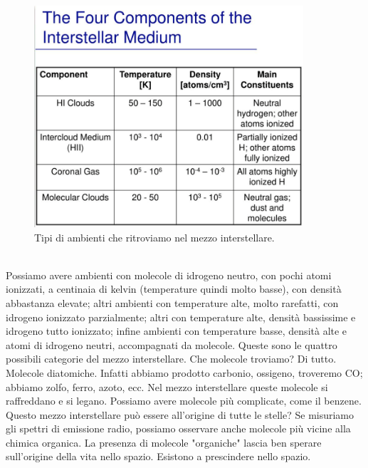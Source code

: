 \documentclass[a4paper,11pt]{article}
\begin{document}
\begin{figure}[h!!]
        \centering
        \includegraphics[width=10cm]{lezione 28 novembre/composizionenubi.png}
        \caption{Tipi di ambienti che ritroviamo nel mezzo interstellare.}
        \label{lezione 28 novembre/composizionenubi.png}
    \end{figure}
    \\
Possiamo avere ambienti con molecole di idrogeno neutro, con pochi atomi ionizzati, a centinaia di kelvin (temperature quindi molto basse), con densità abbastanza elevate; altri ambienti con temperature alte, molto rarefatti, con idrogeno ionizzato parzialmente; altri con temperature alte, densità bassissime e idrogeno tutto ionizzato; infine ambienti con temperature basse, densità alte e atomi di idrogeno neutri, accompagnati da molecole. Queste sono le quattro possibili categorie del mezzo interstellare. Che molecole troviamo? Di tutto. Molecole diatomiche. Infatti abbiamo prodotto carbonio, ossigeno, troveremo CO; abbiamo zolfo, ferro, azoto, ecc. Nel mezzo interstellare queste  molecole si raffreddano e si legano. Possiamo avere molecole più complicate, come il benzene. Questo mezzo interstellare può essere all'origine di tutte le stelle? Se misuriamo gli spettri di emissione radio, possiamo osservare anche molecole più vicine alla chimica organica. La presenza di molecole "organiche" lascia ben sperare sull'origine della vita nello spazio. Esistono a prescindere nello spazio. \\ 
\end{document}
